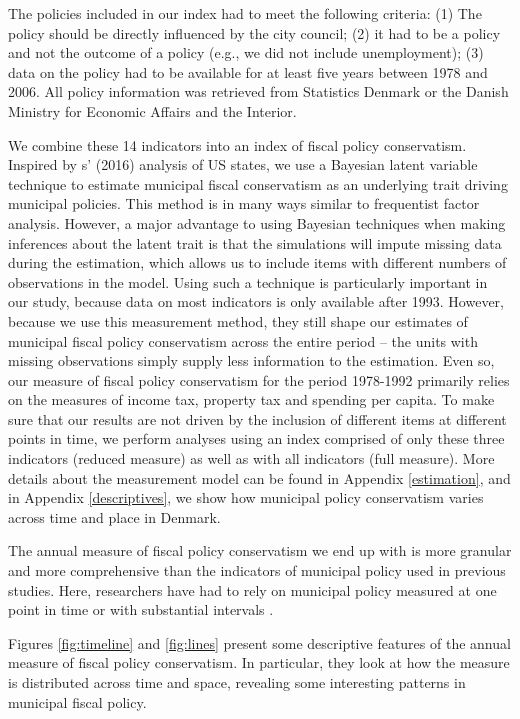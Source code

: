\documentclass[a4paper,12pt]{article}
\begin{document}
The policies included in our index had to meet the following criteria: (1) The policy should be directly influenced by the city council; (2) it had to be a policy and not the outcome of a policy (e.g., we did not include unemployment); (3) data on the policy had to be available for at least five years between 1978 and 2006. All policy information was retrieved from Statistics Denmark or the Danish Ministry for Economic Affairs and the Interior.

We combine these 14 indicators into an index of fiscal policy conservatism. Inspired by \citeauthor{caughey2016dynamics}s' (2016) analysis of US states, we use a Bayesian latent variable technique to estimate municipal fiscal conservatism as an underlying trait driving municipal policies.  This method is in many ways similar to frequentist factor analysis. However, a major advantage to using Bayesian techniques when making inferences about the latent trait is that the simulations will impute missing data during the estimation, which allows us to include items with different numbers of observations in the model. Using such a technique is particularly important in our study, because data on most indicators is only available after 1993. However, because we use this measurement method, they still shape our estimates of municipal fiscal policy conservatism across the entire period -- the units with missing observations simply supply less information to the estimation. Even so, our measure of fiscal policy conservatism for the period 1978-1992 primarily relies on the measures of income tax, property tax and spending per capita. To make sure that our results are not driven by the inclusion of different items at different points in time, we perform analyses using an index comprised of only these three indicators (reduced measure) as well as with all indicators (full measure). More details about the measurement model can be found in Appendix \ref{estimation}, and in Appendix \ref{descriptives}, we show how municipal policy conservatism varies across time and place in Denmark.

The annual measure of fiscal policy conservatism we end up with is more granular and more comprehensive than the indicators of municipal policy used in previous studies. Here, researchers have had to rely on municipal policy measured at one point in time \citep{tausanovitch2014representation,palus2010responsiveness} or  with substantial intervals \citep{sances2017voters,einstein2016pushing,hajnal2010or}. 

Figures \ref{fig:timeline} and \ref{fig:lines} present some descriptive features of the annual measure of fiscal policy conservatism. In particular, they look at how the measure is distributed across time and space, revealing some interesting patterns in municipal fiscal policy.
\end{document}
